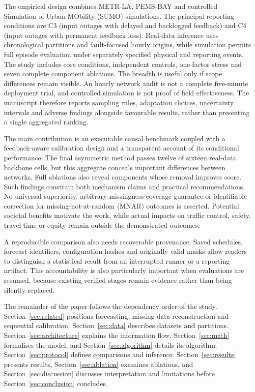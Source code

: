 \documentclass[pdflatex,sn-mathphys-num]{sn-jnl}
\newcounter{algorithm}
\begin{document}
The empirical design combines METR-LA, PEMS-BAY and controlled Simulation of Urban MObility (SUMO) simulations. The principal reporting conditions are C3 (input outages with delayed and backlogged feedback) and C4 (input outages with permanent feedback loss). Real-data inference uses chronological partitions and fault-focused hourly origins, while simulation permits full episode evaluation under separately specified physical and reporting events. The study includes core conditions, independent controls, one-factor stress and seven complete component ablations. The breadth is useful only if scope differences remain visible. An hourly network audit is not a complete five-minute deployment trial, and controlled simulation is not proof of field effectiveness. The manuscript therefore reports sampling rules, adaptation choices, uncertainty intervals and adverse findings alongside favourable results, rather than presenting a single aggregated ranking.

The main contribution is an executable causal benchmark coupled with a feedback-aware calibration design and a transparent account of its conditional performance. The final asymmetric method passes twelve of sixteen real-data backbone cells, but this aggregate conceals important differences between networks. Full ablations also reveal components whose removal improves score. Such findings constrain both mechanism claims and practical recommendations. No universal superiority, arbitrary-missingness coverage guarantee or identifiable correction for missing-not-at-random (MNAR) outcomes is asserted. Potential societal benefits motivate the work, while actual impacts on traffic control, safety, travel time or equity remain outside the demonstrated outcomes.

A reproducible comparison also needs recoverable provenance. Saved schedules, forecast identifiers, configuration hashes and originally valid masks allow readers to distinguish a statistical result from an interrupted runner or a reporting artifact. This accountability is also particularly important when evaluations are resumed, because existing verified stages remain evidence rather than being silently replaced.

The remainder of the paper follows the dependency order of the study. Section~\ref{sec:related} positions forecasting, missing-data reconstruction and sequential calibration. Section~\ref{sec:data} describes datasets and partitions. Section~\ref{sec:architecture} explains the information flow. Section~\ref{sec:math} formalises the model, and Section~\ref{sec:algorithm} details its algorithm. Section~\ref{sec:protocol} defines comparisons and inference. Section~\ref{sec:results} presents results, Section~\ref{sec:ablation} examines ablations, and Section~\ref{sec:discussion} discusses interpretation and limitations before Section~\ref{sec:conclusion} concludes.
\end{document}
